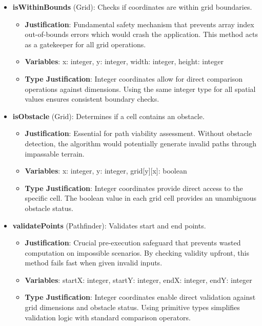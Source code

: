 \begin{itemize}
  \item \textbf{isWithinBounds} (Grid): Checks if coordinates are within grid boundaries.
    \begin{itemize}
      \item \textbf{Justification}: Fundamental safety mechanism that prevents array index out-of-bounds errors which would crash the application. This method acts as a gatekeeper for all grid operations.
      \item \textbf{Variables}: x: integer, y: integer, width: integer, height: integer
      \item \textbf{Type Justification}: Integer coordinates allow for direct comparison operations against dimensions. Using the same integer type for all spatial values ensures consistent boundary checks.
    \end{itemize}
    
  \item \textbf{isObstacle} (Grid): Determines if a cell contains an obstacle.
    \begin{itemize}
      \item \textbf{Justification}: Essential for path viability assessment. Without obstacle detection, the algorithm would potentially generate invalid paths through impassable terrain.
      \item \textbf{Variables}: x: integer, y: integer, grid[y][x]: boolean
      \item \textbf{Type Justification}: Integer coordinates provide direct access to the specific cell. The boolean value in each grid cell provides an unambiguous obstacle status.
    \end{itemize}
    
  \item \textbf{validatePoints} (Pathfinder): Validates start and end points.
    \begin{itemize}
      \item \textbf{Justification}: Crucial pre-execution safeguard that prevents wasted computation on impossible scenarios. By checking validity upfront, this method fails fast when given invalid inputs.
      \item \textbf{Variables}: startX: integer, startY: integer, endX: integer, endY: integer
      \item \textbf{Type Justification}: Integer coordinates enable direct validation against grid dimensions and obstacle status. Using primitive types simplifies validation logic with standard comparison operators.
    \end{itemize}
\end{itemize}

